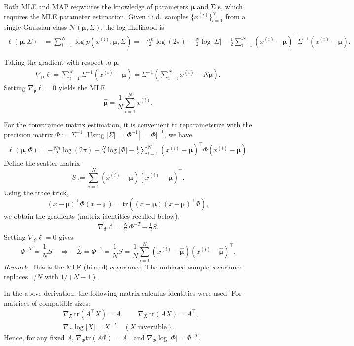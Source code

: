 \documentclass{article}
\begin{document}
Both MLE and MAP reqwuires the knowledge of parameters $\mathbf{\mu}$ and $\mathbf{\Sigma}$'s,
which requires the MLE parameter estimation.
Given i.i.d.\ samples $\{x^{(i)}\}_{i=1}^N$ from a single Gaussian class $\mathcal{N}(\boldsymbol{\mu},\Sigma)$, the log-likelihood is
\begin{align}
\ell(\boldsymbol{\mu},\Sigma)
&= \sum_{i=1}^N \log p(x^{(i)};\boldsymbol{\mu},\Sigma)
= -\frac{N n}{2}\log(2\pi) - \frac{N}{2}\log|\Sigma|
  - \frac{1}{2}\sum_{i=1}^N (x^{(i)}-\boldsymbol{\mu})^\top \Sigma^{-1} (x^{(i)}-\boldsymbol{\mu}).
\end{align}

Taking the gradient with respect to $\boldsymbol{\mu}$:
\begin{align}
\nabla_{\boldsymbol{\mu}} \ell
= \sum_{i=1}^N \Sigma^{-1}(x^{(i)}-\boldsymbol{\mu})
= \Sigma^{-1}\!\left(\sum_{i=1}^N x^{(i)} - N\boldsymbol{\mu}\right).
\end{align}
Setting $\nabla_{\boldsymbol{\mu}}\ell=0$ yields the MLE
\[
\widehat{\boldsymbol{\mu}}=\frac{1}{N}\sum_{i=1}^N x^{(i)}.
\]

For the convaraince matrix estimation, it is convenient to reparameterize with the precision matrix $\Phi:=\Sigma^{-1}$. Using $|\Sigma|=|\Phi^{-1}|=|\Phi|^{-1}$, we have
\begin{align}
\ell(\boldsymbol{\mu},\Phi)
= -\frac{N n}{2}\log(2\pi) + \frac{N}{2}\log|\Phi|
  - \frac{1}{2}\sum_{i=1}^N (x^{(i)}-\boldsymbol{\mu})^\top \Phi (x^{(i)}-\boldsymbol{\mu}).
\end{align}
Define the scatter matrix
\[
S := \sum_{i=1}^N (x^{(i)}-\boldsymbol{\mu})(x^{(i)}-\boldsymbol{\mu})^\top.
\]
Using the trace trick,
\[
(x-\boldsymbol{\mu})^\top \Phi (x-\boldsymbol{\mu})
= \mathrm{tr}\!\left( (x-\boldsymbol{\mu})(x-\boldsymbol{\mu})^\top \Phi \right),
\]
we obtain the gradients (matrix identities recalled below):
\begin{align}
\nabla_{\Phi}\ell
= \frac{N}{2} \, \Phi^{-T} - \frac{1}{2} S.
\end{align}
Setting $\nabla_{\Phi}\ell=0$ gives
\[
\Phi^{-T} = \frac{1}{N} S
\quad\Longrightarrow\quad
\widehat{\Sigma} = \Phi^{-1} = \frac{1}{N} S
= \frac{1}{N} \sum_{i=1}^N (x^{(i)}-\widehat{\boldsymbol{\mu}})(x^{(i)}-\widehat{\boldsymbol{\mu}})^\top.
\]
\emph{Remark.} This is the MLE (biased) covariance. 
The unbiased sample covariance replaces $1/N$ with $1/(N-1)$.

In the above derivation, the following matrix-calculus identities were used.
For matrices of compatible sizes:
\begin{align}
&\nabla_{X} \,\mathrm{tr}(A^\top X) = A, \qquad
\nabla_{X} \,\mathrm{tr}(A X) = A^\top,\\
&\nabla_{X} \log|X| = X^{-T} \quad (\text{$X$ invertible}).
\end{align}
Hence, for any fixed $A$, $\nabla_{\Phi}\mathrm{tr}(A\Phi)=A^\top$ and
$\nabla_{\Phi}\log|\Phi|=\Phi^{-T}$.
\end{document}

